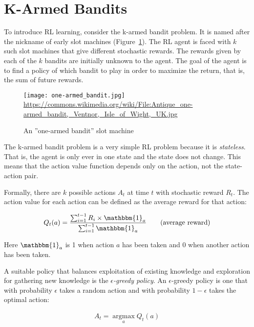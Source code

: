 \section{K-Armed Bandits}

To introduce RL learning, consider the k-armed bandit problem. It is named after the nickname of early slot machines (Figure~\ref{fig:bandit}). The RL agent is faced with $k$ such slot machines that give different stochastic rewards. The rewards given by each of the $k$ bandits are initially unknown to the agent. The goal of the agent is to find a policy of which bandit to play in order to maximize the return, that is, the sum of future rewards.

\begin{figure}
\centering
\texttt{[image: one-armed\_bandit.jpg]}\\
\tiny \url{https://commons.wikimedia.org/wiki/File:Antique_one-armed_bandit,_Ventnor,_Isle_of_Wight,_UK.jpg}
\caption{An ''one-armed bandit'' slot machine}
\label{fig:bandit}
\end{figure}

The k-armed bandit problem is a very simple RL problem because it is \emph{stateless}. That is, the agent is only ever in one state and the state does not change. This means that the action value function depends only on the action, not the state-action pair.

Formally, there are $k$ possible actions $A_t$ at time $t$ with stochastic reward $R_t$. The action value for each action can be defined as the average reward for that action:

\begin{align*}
   Q_t(a) = \frac{\sum_{i=1}^{t-1} R_i \times \mathbbm{1}_a}{\sum_{i=1}^{t-1} \mathbbm{1}_a} \qquad \text{(average reward)}
\end{align*}

Here $\mathbbm{1}_a$ is 1 when action $a$ has been taken and 0 when another action has been taken. 

A suitable policy that balances exploitation of existing knowledge and exploration for gathering new knowledge is the \emph{$\epsilon$-greedy policy}. An $\epsilon$-greedy policy is one that with probability $\epsilon$ takes a random action and with probability $1-\epsilon$ takes the optimal action:

\begin{align*}
A_t = \operatorname*{arg max}_a Q_t(a)
\end{align*}


